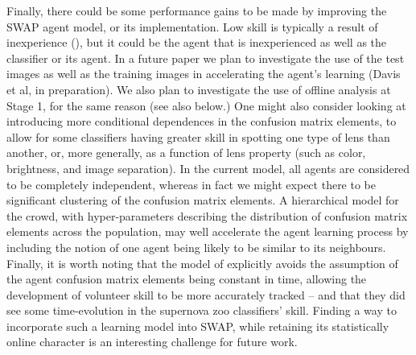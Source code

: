 \documentclass[useAMS,usenatbib,a4paper]{mn2e}
\begin{document}
Finally, there could be some performance gains to be made by improving the
SWAP agent model, or its implementation. Low skill is typically a result  of
inexperience (), but it could be the agent that is
inexperienced as well as the classifier or its agent. In a future paper we
plan to investigate the use of the test images as well as the training images
in accelerating the agent's learning (Davis et al, in preparation). We also
plan to investigate the use of offline analysis at Stage 1, for the same
reason (see also  below.) 
One might also consider looking at
introducing more conditional dependences in the confusion matrix elements, to
allow for some classifiers having greater skill in spotting one type of lens
than another, or, more generally, as a function of lens property (such as
color, brightness, and image separation). In the current model, all agents are
considered to be completely independent, whereas in fact we might expect there
to be significant clustering of the confusion matrix elements. A hierarchical
model for the crowd, with hyper-parameters describing the distribution of
confusion matrix elements across the population, may well accelerate the agent
learning process by including the notion of one agent being likely to be
similar to its neighbours. Finally, it is worth noting that the model of
\citet{IBCC} explicitly avoids the assumption of the agent confusion matrix
elements being constant in time, allowing the development of volunteer skill
to be more accurately tracked -- and that they did see some time-evolution in
the supernova zoo classifiers' skill. Finding a way to incorporate such a
learning model into SWAP, while retaining its statistically online character
is an interesting challenge for future work.
\end{document}
